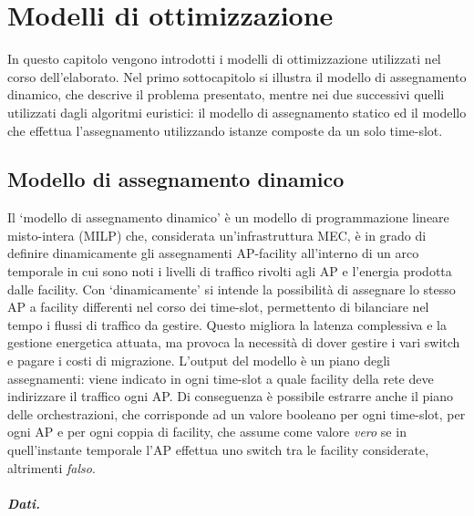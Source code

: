 \chapter{Modelli di ottimizzazione}
\label{cap:modelli-ottimizzazione}

In questo capitolo vengono introdotti i modelli di ottimizzazione utilizzati nel corso dell'elaborato. Nel primo sottocapitolo si illustra il modello di assegnamento dinamico, che descrive il problema presentato, mentre nei due successivi quelli utilizzati dagli algoritmi euristici: il modello di assegnamento statico ed il modello che effettua l'assegnamento utilizzando istanze composte da un solo time-slot.


%
%
\section{Modello di assegnamento dinamico}
\label{sec:modello-dinamico}

Il `modello di assegnamento dinamico' è un modello di programmazione lineare misto-intera (MILP) che, considerata un'infrastruttura MEC, è in grado di definire dinamicamente gli assegnamenti AP-facility all'interno di un arco temporale in cui sono noti i livelli di traffico rivolti agli AP e l'energia prodotta dalle facility. Con `dinamicamente' si intende la possibilità di assegnare lo stesso AP a facility differenti nel corso dei time-slot, permettento di bilanciare nel tempo i flussi di traffico da gestire. Questo migliora la latenza complessiva e la gestione energetica attuata, ma provoca la necessità di dover gestire i vari switch e pagare i costi di migrazione. L'output del modello è un piano degli assegnamenti: viene indicato in ogni time-slot a quale facility della rete deve indirizzare il traffico ogni AP. Di conseguenza è possibile estrarre anche il piano delle orchestrazioni, che corrisponde ad un valore booleano per ogni time-slot, per ogni AP e per ogni coppia di facility, che assume come valore \textit{vero} se in quell'instante temporale l'AP effettua uno switch tra le facility considerate, altrimenti \textit{falso}.

\paragraph*{Dati.}

